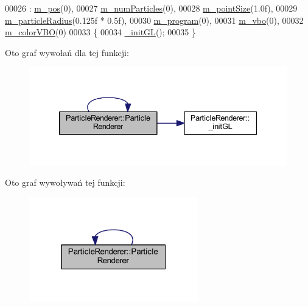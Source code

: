 \begin{DoxyCode}
00026     : \hyperlink{class_particle_renderer_a1d74720edb5c3a13edcdd176ac0d84c7}{m\_pos}(0),
00027       \hyperlink{class_particle_renderer_af885fdb5e6da925209dfd960f66b5fd8}{m\_numParticles}(0),
00028       \hyperlink{class_particle_renderer_a1ca13e546c937cb546c0da19fa853b34}{m\_pointSize}(1.0f),
00029       \hyperlink{class_particle_renderer_aab5ee3cd769a64c45dc9714aabdb0ee2}{m\_particleRadius}(0.125f * 0.5f),
00030       \hyperlink{class_particle_renderer_ab8f0dd1a6e0f4401012bd46ae8940648}{m\_program}(0),
00031       \hyperlink{class_particle_renderer_a7549feaa0982abbc44c9fe73f2eb251f}{m\_vbo}(0),
00032       \hyperlink{class_particle_renderer_a7dcaa73a41c598207974432206b423b5}{m\_colorVBO}(0)
00033 \{
00034     \hyperlink{class_particle_renderer_ac75c7f73a0014333305b174b8863a46b}{\_initGL}();
00035 \}
\end{DoxyCode}


Oto graf wywołań dla tej funkcji\-:\nopagebreak
\begin{figure}[H]
\begin{center}
\leavevmode
\includegraphics[width=339pt]{class_particle_renderer_a1718484686c2e6db488cc88c433d03cc_cgraph}
\end{center}
\end{figure}




Oto graf wywoływań tej funkcji\-:\nopagebreak
\begin{figure}[H]
\begin{center}
\leavevmode
\includegraphics[width=208pt]{class_particle_renderer_a1718484686c2e6db488cc88c433d03cc_icgraph}
\end{center}
\end{figure}


